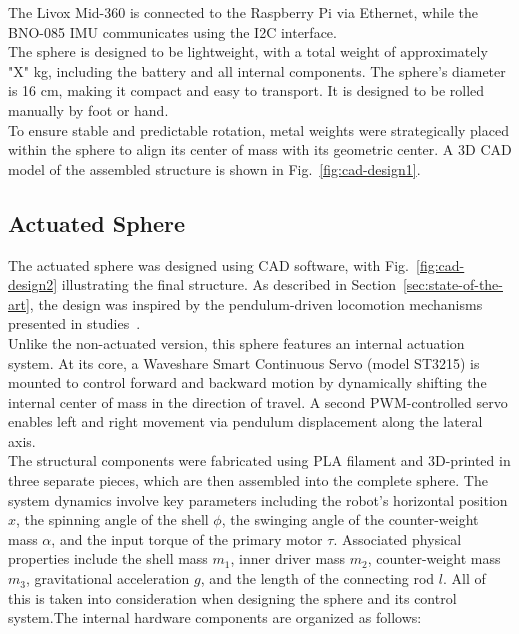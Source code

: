 \documentclass[conference]{IEEEtran}
\begin{document}
The Livox Mid-360 is connected to the Raspberry Pi via Ethernet, while the BNO-085 IMU communicates using the I2C interface. \\
\hspace*{1em}The sphere is designed to be lightweight, with a total weight of approximately "X" kg, including the battery and all internal components. The sphere's diameter is 16 cm, making it compact and easy to transport. It is designed to be rolled manually by foot or hand.\\
\hspace*{1em}To ensure stable and predictable rotation, metal weights were strategically placed within the sphere to align its center of mass with its geometric center. A 3D CAD model of the assembled structure is shown in Fig.~\ref{fig:cad-design1}.



\subsection{Actuated Sphere}

The actuated sphere was designed using CAD software, with Fig.~\ref{fig:cad-design2} illustrating the final structure. As described in Section~\ref{sec:state-of-the-art}, the design was inspired by the pendulum-driven locomotion mechanisms presented in studies~\cite{roboball, novelsphere}.\\
\hspace*{1em}Unlike the non-actuated version, this sphere features an internal actuation system. At its core, a Waveshare Smart Continuous Servo (model ST3215) is mounted to control forward and backward motion by dynamically shifting the internal center of mass in the direction of travel. A second PWM-controlled servo enables left and right movement via pendulum displacement along the lateral axis.\\
\hspace*{1em}The structural components were fabricated using PLA filament and 3D-printed in three separate pieces, which are then assembled into the complete sphere.
\hspace*{1em}The system dynamics involve key parameters including the robot’s horizontal position \( x \), the spinning angle of the shell \( \phi \), the swinging angle of the counter-weight mass \( \alpha \), and the input torque of the primary motor \( \tau \). Associated physical properties include the shell mass \( m_1 \), inner driver mass \( m_2 \), counter-weight mass \( m_3 \), gravitational acceleration \( g \), and the length of the connecting rod \( l \). All of this is taken into consideration when designing the sphere and its control system.The internal hardware components are organized as follows:
\end{document}
